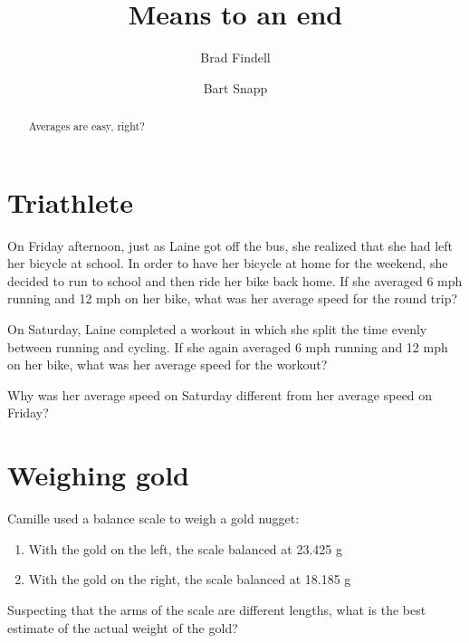 \documentclass[handout,space,nooutcomes]{ximera}
\title{Means to an end}
\author{Brad Findell \and Bart Snapp}
\begin{document}
\begin{abstract}
Averages are easy, right?
\end{abstract}
\maketitle

\section*{Triathlete}

\begin{question}
On Friday afternoon, just as Laine got off the bus, she realized that
she had left her bicycle at school.  In order to have her bicycle at
home for the weekend, she decided to run to school and then ride her
bike back home.  If she averaged 6 mph running and 12 mph on her bike,
what was her average speed for the round trip?
\begin{freeResponse}
\end{freeResponse}
\end{question}

\begin{question}
On Saturday, Laine completed a workout in which she split the time
evenly between running and cycling.  If she again averaged 6 mph
running and 12 mph on her bike, what was her average speed for the
workout?
\begin{freeResponse}
\end{freeResponse}
\end{question}


\break

\begin{question}
Why was her average speed on Saturday different from her average speed
on Friday?
\begin{freeResponse}
\end{freeResponse}
\end{question}

\section*{Weighing gold}
 
\begin{question}
Camille used a balance scale to weigh a gold nugget:
\begin{enumerate}
\item With the gold on the left, the scale balanced at 23.425 g
\item With the gold on the right, the scale balanced at 18.185 g
\end{enumerate}
Suspecting that the arms of the scale are different lengths, what is
the best estimate of the actual weight of the gold?
\begin{freeResponse}
\end{freeResponse}
\end{question}
\end{document}
